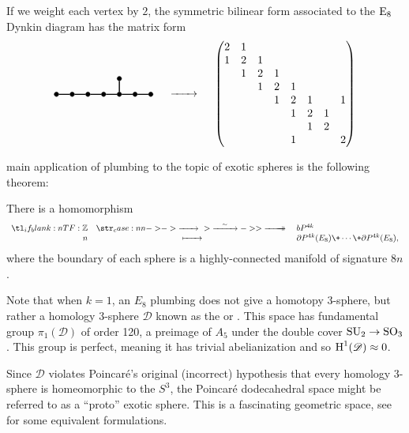 \begin{example}
	If we weight each vertex by $2$, the symmetric bilinear form associated to the $\mathrm{E}_8$ Dynkin diagram has the matrix form
	\[
		\begin{tikzpicture}
			\tikzset{dynode/.style={circle, draw, fill=black,
						minimum size=4pt, inner sep=0pt}}
			\tikzset{dyline/.style={line width=1pt}}
			\tikzset{dydash/.style={line width=1pt, dashed}}

			\begin{scope}[yshift=-10em, xshift=0]
				\node[dynode] (a1) at (0,0) {};
				\node[dynode] (a2) at (0.5,0) {};
				\node[dynode] (a3) at (1,0) {};
				\node[dynode] (a4) at (1.5,0) {};
				\node[dynode] (a5) at (2,0) {};
				\node[dynode] (a6) at (2.5,0) {};
				\node[dynode] (a7) at (3,0) {};
				\node[dynode] (a8) at (2,0.5) {};

				\draw[dyline] (a1) -- (a2) -- (a3) -- (a4) -- (a5) -- (a6) -- (a7);
				\draw[dyline] (a5) -- (a8);
			\end{scope}
		\end{tikzpicture}
		\quad\lkxto\quad
		\begin{pmatrix}
			2 & 1 &   &   &   &   &   &   \\
			1 & 2 & 1 &   &   &   &   &   \\
			  & 1 & 2 & 1 &   &   &   &   \\
			  &   & 1 & 2 & 1 &   &   &   \\
			  &   &   & 1 & 2 & 1 &  & 1 \\
			  &   &   &   & 1 & 2 & 1 &  \\
			  &   &   &   &  & 1 & 2 &  \\
			  &   &   &   & 1 &  &  & 2 \\
		\end{pmatrix}
	\]	
\end{example}


main application of plumbing to the topic of exotic spheres is the following theorem:

\begin{theorem}
	There is a homomorphism
	\[
		\lkxfunc{}{\Z}{\bP^{4k}}{n}{\partial P^{4k}(E_8)\+\cdots\+\partial P^{4k}(E_8),}
	\]
	where the boundary of each sphere is a highly-connected manifold of signature $8n$.
\end{theorem}

\begin{remark}
	Note that when $k=1$, an $E_8$ plumbing does not give a homotopy $3$-sphere, but rather a homology $3$-sphere $\mathscr{D}$ known as the  or . This space has fundamental group $\pi_1(\mathscr{D})$ of order 120, a preimage of $A_5$ under the double cover $\mathrm{SU}_2 \to \mathrm{SO}_3$. This group is perfect, meaning it has trivial abelianization and so $\operatorname{H}^1(\mathscr{D})\approx 0$. 

	Since $\mathcal{D}$ violates Poincar\'e's original (incorrect) hypothesis that every homology $3$-sphere is homeomorphic to the $S^3$, the Poincar\'e dodecahedral space might be referred to as a ``proto'' exotic sphere. This is a fascinating geometric space, see \cite{kirby1979eight} for some equivalent formulations.
\end{remark}
